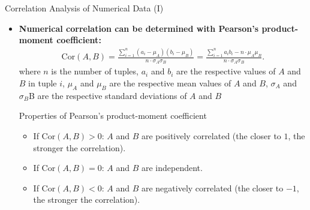 \begin{frame}{Correlation Analysis of Numerical Data (I)}
	\begin{itemize}
		\item \textbf{Numerical correlation can be determined with
				      {\color{airforceblue}Pearson's product-moment coefficient}:}
		      \begin{align*}
			      \text{Cor}(A, B) = \frac{\sum_{i=1}^{n}
				      (a_i-\mu_{A})(b_i-\mu_{B})}{n\cdot\sigma_{A}\sigma_{B}} =
			      \frac{\sum_{i=1}^{n} a_i b_i -n\cdot\mu_{A}\mu_{B}}{n\cdot
				      \sigma_{A}\sigma_{B}}.
		      \end{align*}
		      where $n$ is the number of tuples, $a_i$ and $b_i$ are the
		      respective values of $A$ and $B$ in tuple $i$,
		      $\mu_A$ and $\mu_B$ are the respective mean values of $A$ and $B$,
		      $\sigma_{A}$ and $\sigma_{B}$B are the respective standard
		      deviations of $A$ and $B$

		      \vspace*{2mm}

		      \begin{block}{Properties of Pearson's product-moment coefficient}
			      \begin{itemize}
				      \item If $\text{Cor}(A, B) > 0$: $A$ and $B$ are positively
				            correlated (the closer to $1$, the stronger the correlation).
				      \item If $\text{Cor}(A, B) = 0$: $A$ and $B$ are independent.
				      \item If $\text{Cor}(A, B) < 0$: $A$ and $B$ are negatively correlated (the closer to $-1$, the stronger the correlation).

			      \end{itemize}
		      \end{block}
	\end{itemize}
\end{frame}

